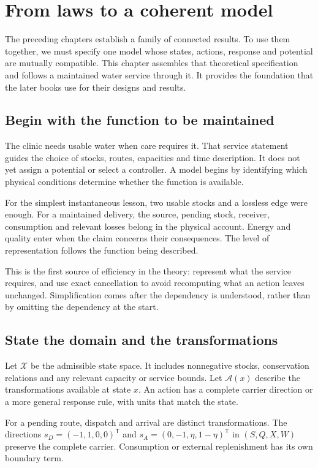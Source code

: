 \chapter{From laws to a coherent model}\label{ch:experimental-bridge}

The preceding chapters establish a family of connected results. To use them together, we must specify one model whose states, actions, response and potential are mutually compatible. This chapter assembles that theoretical specification and follows a maintained water service through it. It provides the foundation that the later books use for their designs and results.

\section{Begin with the function to be maintained}
The clinic needs usable water when care requires it. That service statement guides the choice of stocks, routes, capacities and time description. It does not yet assign a potential or select a controller. A model begins by identifying which physical conditions determine whether the function is available.

For the simplest instantaneous lesson, two usable stocks and a lossless edge were enough. For a maintained delivery, the source, pending stock, receiver, consumption and relevant losses belong in the physical account. Energy and quality enter when the claim concerns their consequences. The level of representation follows the function being described.

This is the first source of efficiency in the theory: represent what the service requires, and use exact cancellation to avoid recomputing what an action leaves unchanged. Simplification comes after the dependency is understood, rather than by omitting the dependency at the start.

\section{State the domain and the transformations}
Let $\mathcal X$ be the admissible state space. It includes nonnegative stocks, conservation relations and any relevant capacity or service bounds. Let $\mathcal A(x)$ describe the transformations available at state $x$. An action has a complete carrier direction or a more general response rule, with units that match the state.

For a pending route, dispatch and arrival are distinct transformations. The directions $s_D=(-1,1,0,0)^{\mathsf T}$ and $s_A=(0,-1,\eta,1-\eta)^{\mathsf T}$ in $(S,Q,X,W)$ preserve the complete carrier. Consumption or external replenishment has its own boundary term.

